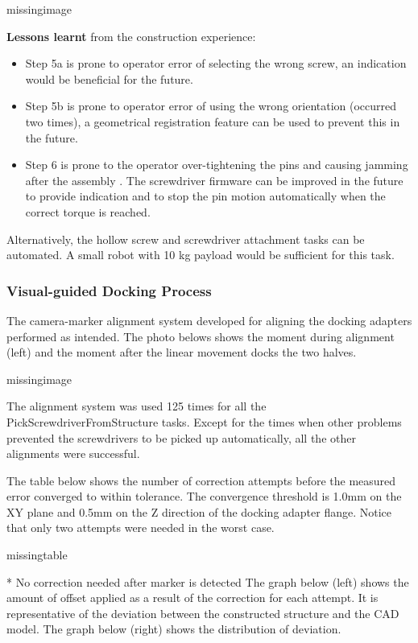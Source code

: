 missingimage

\textbf{Lessons learnt }from the construction experience:
\begin{itemize}
    \item Step 5a is prone to operator error of selecting the wrong screw, an indication would be beneficial for the future.
    \item Step 5b is prone to operator error of using the wrong orientation (occurred two times), a geometrical registration feature can be used to prevent this in the future.
    \item Step 6 is prone to the operator over-tightening the pins and causing jamming after the assembly . The screwdriver firmware can be improved in the future to provide indication and to stop the pin motion automatically when the correct torque is reached.
\end{itemize}

Alternatively, the hollow screw and screwdriver attachment tasks can be automated. A small robot with 10 kg payload would be sufficient for this task.

\subsubsection{Visual-guided Docking Process}
\label{subsubsection:exploration-4-visual-guided-docking-process}

The camera-marker alignment system developed for aligning the docking adapters performed as intended. The photo belows shows the moment during alignment (left) and the moment after the linear movement docks the two halves. 

missingimage

The alignment system was used 125 times for all the PickScrewdriverFromStructure tasks. Except for the times when other problems prevented the screwdrivers to be picked up automatically, all the other alignments were successful.

The table below shows the number of correction attempts before the measured error converged to within tolerance. The convergence threshold is 1.0mm on the XY plane and 0.5mm on the Z direction of the docking adapter flange. Notice that only two attempts were needed in the worst case.

missingtable

* No correction needed after marker is detected
The graph below (left) shows the amount of offset applied as a result of the correction for each attempt. It is representative of the deviation between the constructed structure and the CAD model. The graph below (right) shows the distribution of deviation.

